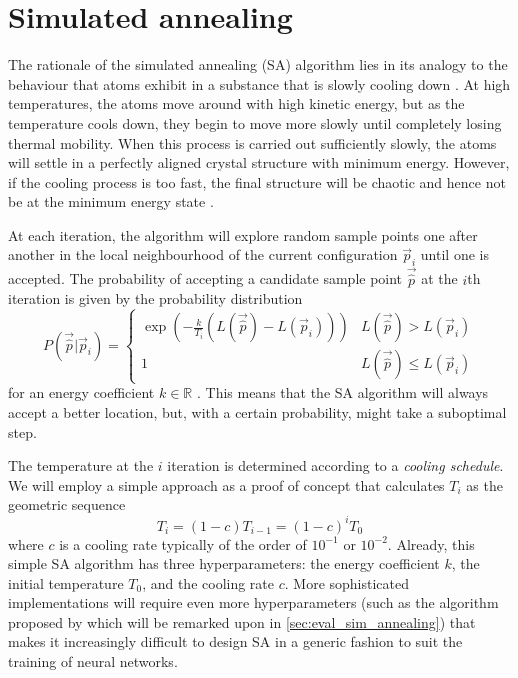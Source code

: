 \section{Simulated annealing}
The rationale of the simulated annealing (SA) algorithm lies in its analogy to the behaviour that atoms exhibit in a substance that is slowly cooling down \cite{kirkpatrick1983}.
At high temperatures, the atoms move around with high kinetic energy, but as the temperature cools down, they begin to move more slowly until completely losing thermal mobility. 
When this process is carried out sufficiently slowly, the atoms will settle in a perfectly aligned crystal structure with minimum energy. 
However, if the cooling process is too fast, the final structure will be chaotic and hence not be at the minimum energy state \cite[444]{press1992}.

At each iteration, the algorithm will explore random sample points one after another in the local neighbourhood of the current configuration $\vec{p}_i$ until one is accepted. 
The probability of accepting a candidate sample point $\vec{\hat{p}}$ at the $i$th iteration is given by the probability distribution
\begin{equation}
    P(\vec{\hat{p}}|\vec{p}_i) = \begin{cases}
        \exp{\left(-\frac{k}{T_i} \left(L(\vec{\hat{p}}) - L(\vec{p}_i)\right) \right)} & L(\vec{\hat{p}}) > L(\vec{p}_i) \\
        1 & L(\vec{\hat{p}}) \leq L(\vec{p}_i)
    \end{cases}
\end{equation}
for an energy coefficient $k\in \mathbb{R}$ \cite{rios2009}.
This means that the SA algorithm will always accept a better location, but, with a certain probability, might take a suboptimal step.

The temperature at the $i$ iteration is determined according to a \textit{cooling schedule}. 
We will employ a simple approach as a proof of concept that calculates $T_i$ as the geometric sequence
\begin{equation}
    T_i = \left(1 - c\right) T_{i-1} = \left(1 - c\right)^i T_0
\end{equation}
where $c$ is a cooling rate typically of the order of $10^{-1}$ or $10^{-2}$.
Already, this simple SA algorithm has three hyperparameters: the energy coefficient $k$, the initial temperature $T_0$, and the cooling rate $c$. 
More sophisticated implementations will require even more hyperparameters (such as the algorithm proposed by \textcite{press1992} which will be remarked upon in \ref{sec:eval_sim_annealing}) that makes it increasingly difficult to design SA in a generic fashion to suit the training of neural networks. 

